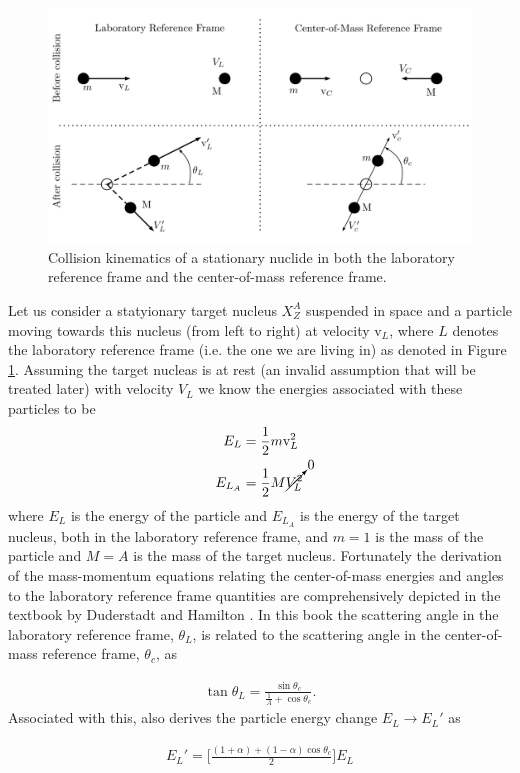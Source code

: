 \documentclass[11pt,letterpaper,titlepage]{article}
\newcommand{\beq}{\begin{equation*}
\begin{aligned}}
\newcommand{\eeq}{\end{aligned}
\end{equation*}}
\newcommand{\beqn}{\begin{equation}
	\begin{aligned}}
\newcommand{\eeqn}{\end{aligned}
	\end{equation}}
\numberwithin{equation}{section}
\begin{document}
\begin{appendices}
\begin{figure}[H]
\centering
\includegraphics[width=0.85\linewidth]{LatexDraw/CollisionKinematics1}
\caption{Collision kinematics of a stationary nuclide in both the laboratory reference frame and the center-of-mass reference frame.}
\label{fig:collisionkinematics1}
\end{figure}


Let us consider a statyionary target nucleus $X_Z^A$ suspended in space and a particle moving towards this nucleus (from left to right) at velocity $\text{v}_{L}$, where $L$ denotes the laboratory reference frame (i.e. the one we are living in) as denoted in Figure \ref{fig:collisionkinematics1}. Assuming the target nucleas is at rest (an invalid assumption that will be treated later) with velocity $V_L$ we know the energies associated with these particles to be 
\beq
E_L &= \frac{1}{2} m \text{v}_L^2 \\
E_{L_A} &= \frac{1}{2} M \cancelto{0}{V_L^2}
\eeq
where $E_L$ is the energy of the particle and $E_{L_A}$ is the energy of the target nucleus, both in the laboratory reference frame, and $m=1$ is the mass of the particle and $M=A$ is the mass of the target nucleus. Fortunately the derivation of the mass-momentum equations relating the center-of-mass energies and angles to the laboratory reference frame quantities are comprehensively depicted in the textbook by Duderstadt and Hamilton \cite{Duderstadt}. In this book the scattering angle in the laboratory reference frame, $\theta_L$, is related to the scattering angle in the center-of-mass reference frame, $\theta_c$, as

\beqn \label{eq:thetaLvsthetac}
\tan \theta_L = \frac{  \sin \theta_c    } {  \frac{1}{A} +\cos \theta_c     }.
\eeqn 
Associated with this, \cite{Duderstadt} also derives the particle energy change $E_L \to E_L'$ as 

\beqn 
E_L' = \biggr[
\frac{  (1+\alpha) + (1-\alpha)\cos \theta_c   }{2}
\biggr] E_L
\eeqn 


\end{appendices}
\end{document}

